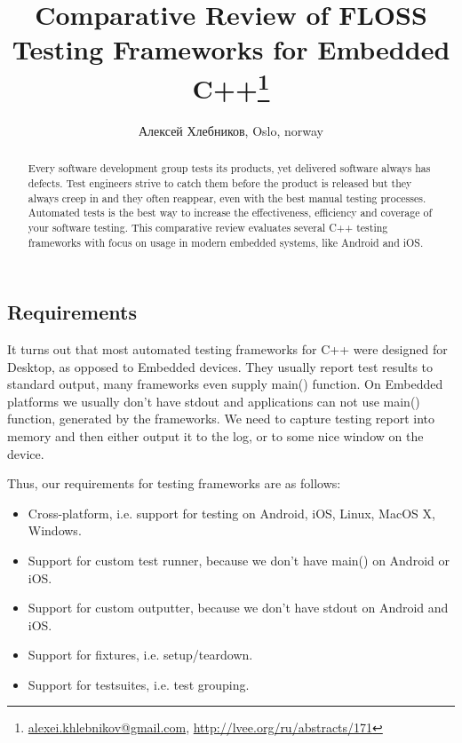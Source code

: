 \documentclass[10pt, a5paper]{article}
\begin{document}
\title{Comparative Review of FLOSS Testing Frameworks for Embedded C++\footnote{\url{alexei.khlebnikov@gmail.com}, \url{http://lvee.org/ru/abstracts/171}}}
\author{Алексей Хлебников, Oslo, norway}
\maketitle
\begin{abstract}
Every software development group tests its products, yet delivered software always has defects. Test engineers strive to catch them before the product is released but they always creep in and they often reappear, even with the best manual testing processes. Automated tests is the best way to increase \linebreak the effectiveness, efficiency and coverage of your software testing. This comparative review evaluates several C++ testing \linebreak frameworks with focus on usage in modern embedded systems, like Android and iOS.
\end{abstract}
\subsection*{Requirements}

It turns out that most automated testing frameworks for C++ were designed for Desktop, as opposed to Embedded devices. They usually report test results to standard output, many frameworks even supply main() function. On Embedded platforms we usually don't have stdout and applications can not use main() function, generated by the frameworks. We need to capture testing report into memory and then either output it to the log, or to some nice window on the device.

Thus, our requirements for testing frameworks are as follows:

\begin{itemize}
  \item Cross-platform, i.e. support for testing on Android, iOS, Linux, MacOS X, Windows.
  \item Support for custom test runner, because we don't have main() on Android or iOS.
  \item Support for custom outputter, because we don't have stdout on Android and iOS.
  \item Support for fixtures, i.e. setup/teardown.
  \item Support for testsuites, i.e. test grouping.
\end{itemize}
\end{document}
